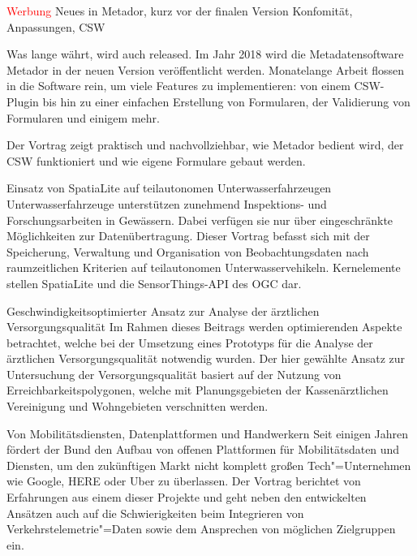 \renewcommand{\conferenceDay}{\freitag}
\textcolor{red}{Werbung}
\newpage
{}
%
{Neues in Metador, kurz vor der finalen Version\vspace{0.2em}}%
{Konfomität, Anpassungen, CSW}%
{%
Was lange währt, wird auch released. Im Jahr 2018 wird die Metadatensoftware Metador
in der neuen Version veröffentlicht werden. Monatelange Arbeit flossen in
die Software rein, um viele Features zu implementieren: von einem CSW-Plugin
bis hin zu einer einfachen Erstellung von Formularen, der Validierung von
Formularen und einigem mehr.

Der Vortrag zeigt praktisch und nachvollziehbar, wie Metador bedient wird,
der CSW funktioniert und wie eigene Formulare gebaut werden.%
}

%
{Einsatz von SpatiaLite auf teil\-autonomen Unterwasserfahrzeugen}%
{}%
{%
Unterwasserfahrzeuge unterstützen zunehmend Inspek\-tions- und Forschungsarbeiten
in Gewässern. Dabei verfügen sie nur über eingeschränkte Möglichkeiten zur
Datenübertragung. Dieser Vortrag befasst sich mit der Speicherung, Verwaltung
und Organisation von Beobachtungsdaten nach raumzeitlichen Kriterien auf
teilautonomen Unterwasservehikeln. Kernelemente stellen SpatiaLite und
die SensorThings-API des OGC dar.%
}

%
{Geschwindigkeitsoptimierter Ansatz zur Analyse der ärztlichen \mbox{Versorgungsqualität}}%
{}%
{%
Im Rahmen dieses Beitrags werden optimierenden Aspekte betrachtet, welche bei
der Umsetzung eines Prototyps für die Analyse der ärztlichen
Versorgungsqualität notwendig wurden. Der hier gewählte Ansatz zur Untersuchung
der Versorgungsqualität basiert auf der Nutzung von Erreichbarkeitspolygonen,
welche mit Planungsgebieten der Kassenärztlichen Vereinigung und Wohngebieten
verschnitten werden.%
}

%
{Von Mobilitätsdiensten, \mbox{Datenplattformen} und Handwerkern}%
{}%
{%
Seit einigen Jahren fördert der Bund den Aufbau von offenen Plattformen für
Mobilitätsdaten und Diensten, um den zukünftigen Markt nicht komplett großen
Tech"=Unternehmen wie Google, HERE oder Uber zu überlassen. Der Vortrag
berichtet von Erfahrungen aus einem dieser Projekte und geht neben den
entwickelten Ansätzen auch auf die Schwierigkeiten beim Integrieren von
Verkehrstelemetrie"=Daten sowie dem Ansprechen von möglichen Zielgruppen ein.%
}

